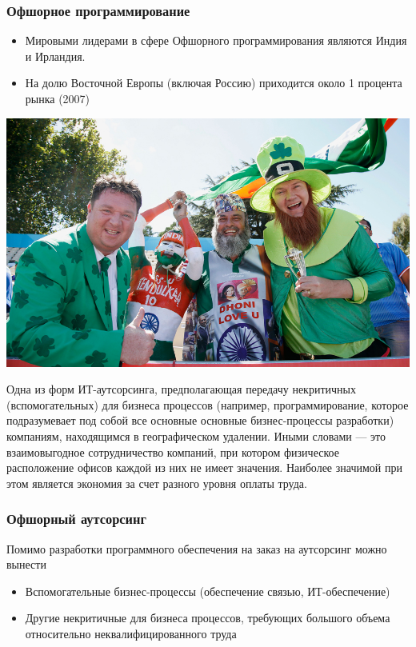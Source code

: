 \documentclass{../industrial-development}
\begin{document}
\begin{frame} \frametitle{Офшорное программирование}
\begin{itemize}
	\item Мировыми лидерами в сфере Офшорного программирования являются Индия и Ирландия. 
	\item На долю Восточной Европы (включая Россию) приходится около 1 процента рынка (2007)
\end{itemize}
\centerline{\includegraphics[height=0.6\textheight]{ayre.png}}
\end{frame}

\lecturenotes
Одна из форм ИТ-аутсорсинга, предполагающая передачу некритичных (\alert{вспомогательных}) для бизнеса процессов (например, \alert{программирование}, которое подразумевает под собой все основные основные бизнес-процессы разработки) компаниям, находящимся в географическом удалении. Иными словами — это взаимовыгодное сотрудничество компаний, при котором физическое расположение офисов каждой из них не имеет значения. Наиболее значимой при этом является экономия за счет разного уровня оплаты труда.  ~\cite[с.~76--84]{Аникин}


\begin{frame} \frametitle{Офшорный аутсорсинг}
Помимо разработки программного обеспечения на заказ на аутсорсинг можно вынести
\begin{itemize}
	\item Вспомогательные бизнес-процессы (обеспечение связью, ИТ-обеспечение)
	\item Другие некритичные для бизнеса процессов, требующих большого объема относительно \alert{неквалифицированного} труда 
\end{itemize}
\end{frame}
\end{document}
